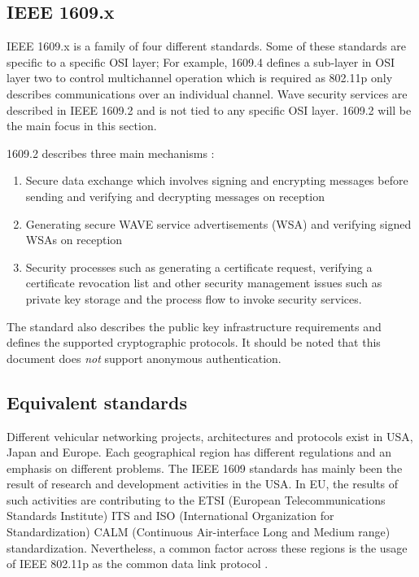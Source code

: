 \subsection{IEEE 1609.x}

IEEE 1609.x is a family of four different standards. Some of these standards are specific to a specific OSI layer; For example, 1609.4 defines a sub-layer in OSI layer two to control multichannel operation which is required as 802.11p only describes communications over an individual channel. Wave security services are described in IEEE 1609.2 and is not tied to any specific OSI layer. 1609.2 will be the main focus in this section.

1609.2 describes three main mechanisms \cite{ieee16092}: 
\begin{enumerate}
	\item Secure data exchange which involves signing and encrypting messages before sending and verifying and decrypting messages on reception
	\item Generating secure WAVE service advertisements (WSA) and verifying signed WSAs on reception
	\item Security processes such as generating a certificate request, verifying a certificate revocation list and other security management issues such as private key storage and the process flow to invoke security services.
\end{enumerate}

The standard also describes the public key infrastructure requirements and defines the supported cryptographic protocols. It should be noted that this document does \textit{not} support anonymous authentication.


\subsection{Equivalent standards}
Different vehicular networking projects, architectures and protocols exist in USA, Japan and Europe. Each geographical region has different regulations and an emphasis on different problems. The IEEE 1609 standards has mainly been the result of research and development activities in the USA. In EU, the results of such activities are contributing to the ETSI (European Telecommunications Standards Institute) ITS and ISO (International Organization for Standardization) CALM (Continuous Air-interface Long and Medium range) standardization. Nevertheless, a common factor across these regions is the usage of IEEE 802.11p  as the common data link protocol \cite{karagiannis2011vehicular}.

